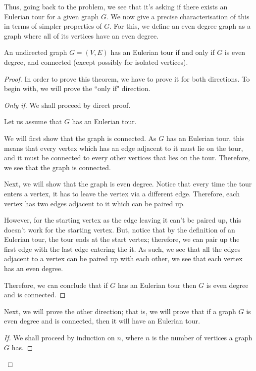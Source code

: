 \documentclass[openany]{book}
\begin{document}
Thus, going back to the problem, we see that it's asking if there exists an Eulerian tour for a given graph $G$. We now give a precise characterisation of this in terms of simpler properties of $G$. For this, we define an even degree graph as a graph where all of its vertices have an even degree.

\begin{thm}
	An undirected graph $G=(V,E)$ has an Eulerian tour if and only if $G$ is even degree, and connected (except possibly for isolated vertices).
\end{thm}
\begin{proof}
	In order to prove this theorem, we have to prove it for both directions. To begin with, we will prove the ``only if" direction.
	\begin{proof}[Only if]
		We shall proceed by direct proof.
		
		Let us assume that $G$ has an Eulerian tour. 
		
		We will first show that the graph is connected. As $G$ has an Eulerian tour, this means that every vertex which has an edge adjacent to it must lie on the tour, and it must be connected to every other vertices that lies on the tour. Therefore, we see that the graph is connected.
		
		Next, we will show that the graph is even degree. Notice that every time the tour enters a vertex, it has to leave the vertex via a different edge. Therefore, each vertex has two edges adjacent to it which can be paired up. 
		
		However, for the starting vertex as the edge leaving it can't be paired up, this doesn't work for the starting vertex. But, notice that by the definition of an Eulerian tour, the tour ends at the start vertex; therefore, we can pair up the first edge with the last edge entering the it. As such, we see that all the edges adjacent to a vertex can be paired up with each other, we see that each vertex has an even degree.
		
		Therefore, we can conclude that if $G$ has an Eulerian tour then $G$ is even degree and is connected.
	\end{proof}

	Next, we will prove the other direction; that is, we will prove that if a graph $G$ is even degree and is connected, then it will have an Eulerian tour.
	\begin{proof}[If]
		We shall proceed by induction on $n$, where $n$ is the number of vertices a graph $G$ has.
		

\end{proof}
\end{proof}
\end{document}

